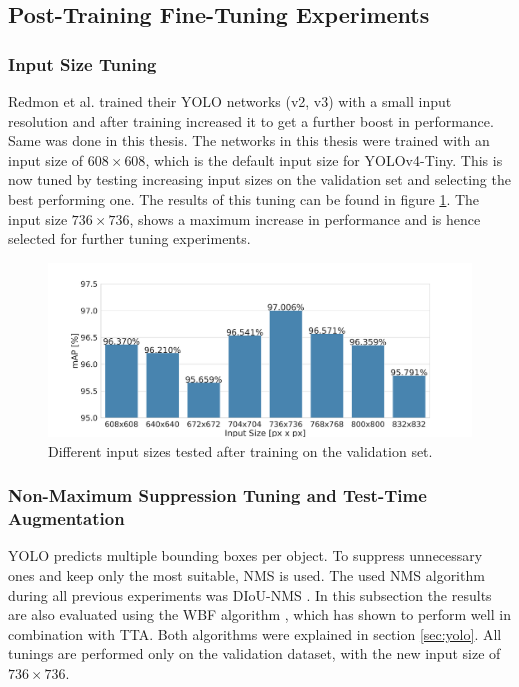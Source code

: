 \subsection{Post-Training Fine-Tuning Experiments}

\subsubsection{Input Size Tuning}

Redmon et al. \cite{yolov2} trained their YOLO networks (v2, v3) with a small input resolution and after training increased it to get a further boost in performance.
Same was done in this thesis.
The networks in this thesis were trained with an input size of $608 \times 608$, which is the default input size for \ac{YOLOv4}-Tiny.
This is now tuned by testing increasing input sizes on the validation set and selecting the best performing one.
The results of this tuning can be found in figure \ref{fig:yolo_input_size}.
The input size $736 \times 736$, shows a maximum increase in performance and is hence selected for further tuning experiments.

\begin{figure}
\begin{center}
    \includegraphics[width=13cm]{imgs/yolo_input_size_tuning.pdf}
    \caption{Different input sizes tested after training on the validation set.}
    \label{fig:yolo_input_size}
\end{center}
\end{figure}

\subsubsection{Non-Maximum Suppression Tuning and Test-Time Augmentation }

YOLO predicts multiple bounding boxes per object.
To suppress unnecessary ones and keep only the most suitable, \ac{NMS} is used.
The used \ac{NMS} algorithm during all previous experiments was \ac{DIoU}-\ac{NMS} \cite{diou}.
In this subsection the results are also evaluated using the \ac{WBF} algorithm \cite{weighted_bbox_fusion}, which has shown to perform well in combination with \ac{TTA}.
Both algorithms were explained in section \ref{sec:yolo}.
All tunings are performed only on the validation dataset, with the new input size of $736 \times 736$.

